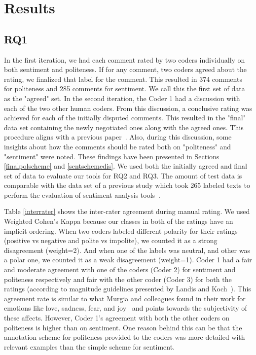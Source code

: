  
\section{Results}

\subsection{RQ1 }\label{gt}

In the first iteration, 
we had each comment rated by two coders individually 
on both sentiment and politeness. 
If for any comment, 
two coders agreed about the rating, 
we finalized that label for the comment. 
This resulted in 374 comments for politeness 
and 285 comments for sentiment. 
We call this the first set of data as the "agreed" set.
In the second iteration, 
the Coder 1 had a discussion 
with each of the two other human coders. 
From this discussion, 
a conclusive rating was achieved 
for each of the initially disputed comments. 
This resulted in the "final" data set 
containing the newly negotiated ones along with the agreed ones. 
This procedure aligns with a previous paper~\cite{ahmed2017senticr}. Also, during this discussion, 
some insights about how the comments should be rated 
both on "politeness" and "sentiment" were noted. 
These findings have been presented in Sections \ref{finalpolscheme} and \ref{sentschemedis}.
We used both the initially agreed and final set of data 
to evaluate our tools for RQ2 and RQ3. 
The amount of test data is comparable 
with the data set of a previous study 
which took 265 labeled texts to 
perform the evaluation of sentiment analysis tools~\cite{jongeling2017negative}.

Table \ref{interrater} shows the inter-rater agreement
during manual rating. 
We used Weighted Cohen's Kappa 
because our classes in both of the ratings 
have an implicit ordering. 
When two coders labeled different polarity 
for their ratings 
(positive vs negative and polite vs impolite), 
we counted it as a strong disagreement (weight=2). 
And when one of the labels was neutral, 
and other was a polar one, 
we counted it as a weak disagreement (weight=1).
Coder 1 had a fair and moderate agreement 
with one of the coders (Coder 2) 
for sentiment and politeness respectively and 
fair with the other coder (Coder 3) for both the ratings 
(according to magnitude guidelines presented by Landis and Koch~\cite{landis1977measurement}). 
This agreement rate is similar to what 
Murgia and colleagues found in their work 
for emotions like love, sadness, fear, and joy~\cite{murgia2014developers} and 
points towards the subjectivity of these affects.
However, 
Coder 1's agreement with both the other coders
on politeness 
is higher than on sentiment. 
One reason behind this can be 
that the annotation scheme for politeness 
provided to the coders 
was more detailed with relevant examples 
than the simple scheme for sentiment. 

